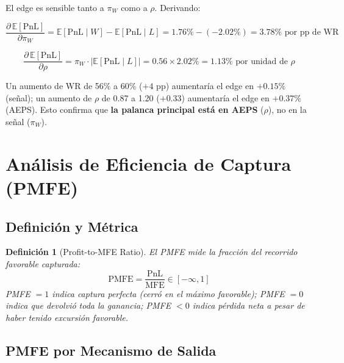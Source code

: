 \documentclass[11pt,a4paper]{article}
\newtheorem{definition}{Definici\'on}[section]
\newcommand{\E}{\mathbb{E}}
\begin{document}
El edge es sensible tanto a $\pi_W$ como a $\rho$. Derivando:

\begin{equation}
\frac{\partial\, \E[\text{PnL}]}{\partial \pi_W}
  = \E[\text{PnL} \mid W] - \E[\text{PnL} \mid L]
  = 1.76\% - (-2.02\%) = 3.78\% \text{ por pp de WR}
\end{equation}

\begin{equation}
\frac{\partial\, \E[\text{PnL}]}{\partial \rho}
  = \pi_W \cdot |\E[\text{PnL} \mid L]|
  = 0.56 \times 2.02\% = 1.13\% \text{ por unidad de } \rho
\end{equation}

Un aumento de WR de 56\% a 60\% ($+4$ pp) aumentar\'ia el edge
en $+0.15\%$ (se\~nal); un aumento de $\rho$ de 0.87 a 1.20
($+0.33$) aumentar\'ia el edge en $+0.37\%$ (AEPS). Esto confirma
que \textbf{la palanca principal est\'a en AEPS} ($\rho$), no en la
se\~nal ($\pi_W$).


\section{An\'alisis de Eficiencia de Captura (PMFE)}
\label{sec:pmfe}

\subsection{Definici\'on y M\'etrica}

\begin{definition}[Profit-to-MFE Ratio]
\label{def:pmfe}
El PMFE mide la fracci\'on del recorrido favorable capturada:
\begin{equation}
\text{PMFE} = \frac{\text{PnL}}{\text{MFE}} \in [-\infty, 1]
\end{equation}
PMFE $= 1$ indica captura perfecta (cerr\'o en el m\'aximo favorable);
PMFE $= 0$ indica que devolvi\'o toda la ganancia; PMFE $< 0$ indica
p\'erdida neta a pesar de haber tenido excursi\'on favorable.
\end{definition}

\subsection{PMFE por Mecanismo de Salida}
\end{document}

